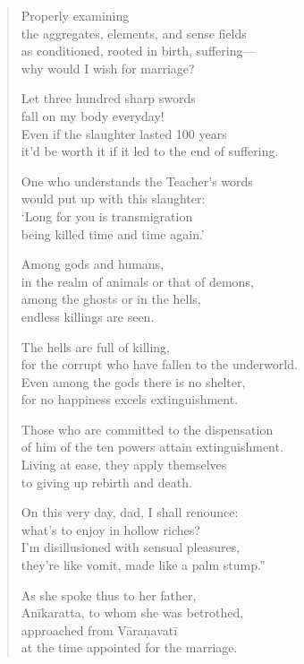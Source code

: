 \documentclass[12pt,openany]{book}%
\begin{document}
\begin{verse}
Properly examining \\
the aggregates, elements, and sense fields \\
as conditioned, rooted in birth, suffering—\\
why would I wish for marriage? 

Let three hundred sharp swords \\
fall on my body everyday! \\
Even if the slaughter lasted 100 years \\
it’d be worth it if it led to the end of suffering. 

One who understands the Teacher’s words \\
would put up with this slaughter: \\
‘Long for you is transmigration \\
being killed time and time again.’ 

Among gods and humans, \\
in the realm of animals or that of demons, \\
among the ghosts or in the hells, \\
endless killings are seen. 

The hells are full of killing, \\
for the corrupt who have fallen to the underworld. \\
Even among the gods there is no shelter, \\
for no happiness excels extinguishment. 

Those who are committed to the dispensation \\
of him of the ten powers attain extinguishment. \\
Living at ease, they apply themselves \\
to giving up rebirth and death. 

On this very day, dad, I shall renounce: \\
what’s to enjoy in hollow riches? \\
I’m disillusioned with sensual pleasures, \\
they’re like vomit, made like a palm stump.” 

As she spoke thus to her father, \\
\textsanskrit{Anīkaratta}, to whom she was betrothed, \\
approached from \textsanskrit{Vāraṇavatī} \\
at the time appointed for the marriage. 


\end{verse}
\end{document}
